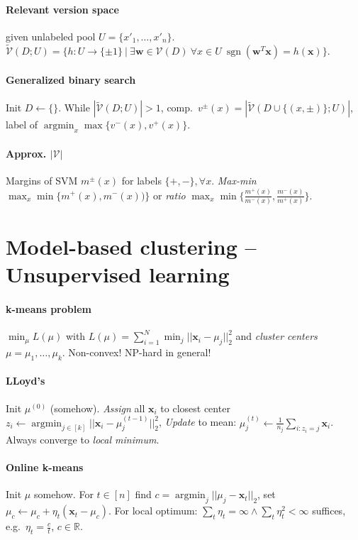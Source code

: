 \documentclass[10pt]{scrartcl}
\DeclareMathOperator{\sign}{sgn}
\DeclareMathOperator{\argmin}{argmin}
\newcommand{\R}{\mathbb{R}}
\begin{document}
\begin{multicols}{3}
\paragraph{Relevant version space} given unlabeled pool $U = \{x'_1,\dots,x'_n\}$.
$\tilde{\mathcal{V}}(D;U) = \{h: U\rightarrow\{\pm 1\}\ |\ \exists\bm w \in \mathcal{V}(D)\ \forall x\in U\ \sign(\bm w^T \bm x) = h(\bm x)\}.$

\paragraph{Generalized binary search}
Init $D \leftarrow \{\}$.
While $|\tilde{\mathcal{V}}(D;U)| > 1$, comp.\ $v^\pm(x) = |\tilde{\mathcal{V}}(D \cup \{(x,\pm)\};U)|$, label of $\argmin_x \max\{v^-(x),v^+(x)\}$.

\paragraph{Approx. $|\mathcal{V}|$}
Margins of SVM $m^\pm(x)$ for labels $\{+,-\}, \forall x$. \emph{Max-min} $\max_x \min\{m^+(x),m^-(x))\}$ or \emph{ratio} $\max_x \min\{\frac{m^+(x)}{m^-(x)},\frac{m^-(x)}{m^+(x)}\}$.

\section{Model-based clustering -- Unsupervised learning}
\paragraph{k-means problem}
$\min_\mu L(\mu)$ with
$L(\mu) = \sum_{i=1}^{N}\min_j||\bm x_i-\mu_j||_2^2$ and \emph{cluster centers} $\mu = \mu_1,\dots,\mu_k$.
Non-convex! NP-hard in general!

\paragraph{LLoyd's}
Init $\mu^{(0)}$ (somehow).
\emph{Assign} all $\bm x_i$ to closest center $z_i \leftarrow \argmin_{j \in [k]} ||\bm x_i - \mu_j^{(t-1)}||_2^2$,
\emph{Update} to mean: $\mu_j^{(t)} \leftarrow \frac{1}{n_j}\sum_{i:z_i = j}\bm x_i$.
Always converge to \emph{local minimum}.

\paragraph{Online k-means} Init $\mu$ somehow.
For $t \in [n]$ find $c = \argmin_j||\mu_j-\bm x_t||_2$, set $\mu_c \leftarrow \mu_c + \eta_t(\bm x_t - \mu_c)$. For local optimum: $\sum_t \eta_t = \infty \wedge \sum_t \eta_t^2 < \infty$ suffices, e.g.\ $\eta_t = \frac{c}{t}$, $c \in \R$.


\end{multicols}
\end{document}

